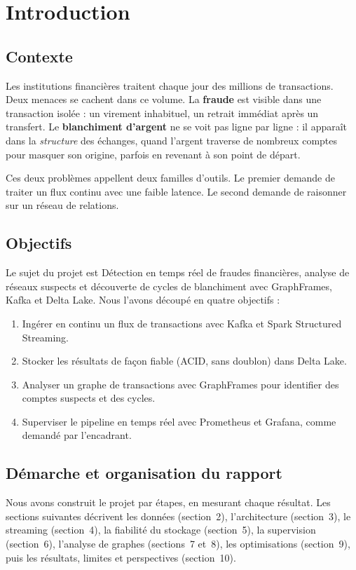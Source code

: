 \documentclass[11pt,a4paper]{article}
\begin{document}
\section{Introduction}
\subsection{Contexte}
Les institutions financi\`eres traitent chaque jour des millions de transactions. Deux menaces se cachent dans ce volume. La \textbf{fraude} est visible dans une transaction isol\'ee : un virement inhabituel, un retrait imm\'ediat apr\`es un transfert. Le \textbf{blanchiment d'argent} ne se voit pas ligne par ligne : il appara\^it dans la \emph{structure} des \'echanges, quand l'argent traverse de nombreux comptes pour masquer son origine, parfois en revenant \`a son point de d\'epart.

Ces deux probl\`emes appellent deux familles d'outils. Le premier demande de traiter un flux continu avec une faible latence. Le second demande de raisonner sur un r\'eseau de relations.

\subsection{Objectifs}
Le sujet du projet est \og D\'etection en temps r\'eel de fraudes financi\`eres, analyse de r\'eseaux suspects et d\'ecouverte de cycles de blanchiment \fg{} avec GraphFrames, Kafka et Delta Lake. Nous l'avons d\'ecoup\'e en quatre objectifs :
\begin{enumerate}
  \item Ing\'erer en continu un flux de transactions avec Kafka et Spark Structured Streaming.
  \item Stocker les r\'esultats de fa\c{c}on fiable (ACID, sans doublon) dans Delta Lake.
  \item Analyser un graphe de transactions avec GraphFrames pour identifier des comptes suspects et des cycles.
  \item Superviser le pipeline en temps r\'eel avec Prometheus et Grafana, comme demand\'e par l'encadrant.
\end{enumerate}

\subsection{D\'emarche et organisation du rapport}
Nous avons construit le projet par \'etapes, en mesurant chaque r\'esultat. Les sections suivantes d\'ecrivent les donn\'ees (section~2), l'architecture (section~3), le streaming (section~4), la fiabilit\'e du stockage (section~5), la supervision (section~6), l'analyse de graphes (sections~7 et~8), les optimisations (section~9), puis les r\'esultats, limites et perspectives (section~10).
\end{document}
